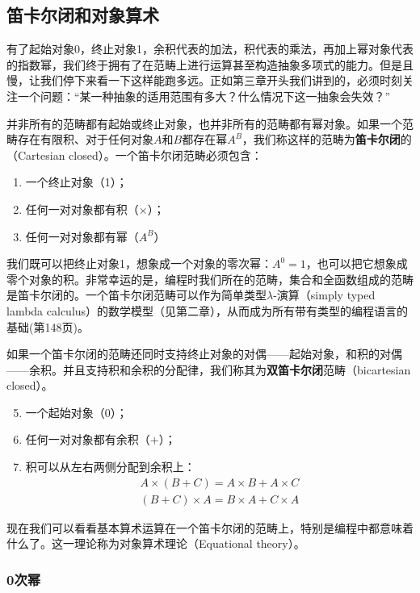 \documentclass{article}
\begin{document}
\subsection{笛卡尔闭和对象算术}

有了起始对象0，终止对象1，余积代表的加法，积代表的乘法，再加上幂对象代表的指数幂，我们终于拥有了在范畴上进行运算甚至构造抽象多项式的能力。但是且慢，让我们停下来看一下这样能跑多远。正如第三章开头我们讲到的，必须时刻关注一个问题：“某一种抽象的适用范围有多大？什么情况下这一抽象会失效？”

并非所有的范畴都有起始或终止对象，也并非所有的范畴都有幂对象。如果一个范畴存在有限积、对于任何对象$A$和$B$都存在幂$A^B$，我们称这样的范畴为\textbf{笛卡尔闭}的（Cartesian closed）。一个笛卡尔闭范畴必须包含：

\begin{enumerate}
\item 一个终止对象（1）；
\item 任何一对对象都有积（$\times$）；
\item 任何一对对象都有幂（$A^B$）
\end{enumerate}

我们既可以把终止对象1，想象成一个对象的零次幂：$A^0 = 1$，也可以把它想象成零个对象的积。非常幸运的是，编程时我们所在的范畴，集合和全函数组成的范畴是笛卡尔闭的。一个笛卡尔闭范畴可以作为简单类型$\lambda$-演算（simply typed lambda calculus）的数学模型（见第二章），从而成为所有带有类型的编程语言的基础(\cite{Milewski2018}第148页)。

如果一个笛卡尔闭的范畴还同时支持终止对象的对偶——起始对象，和积的对偶——余积。并且支持积和余积的分配律，我们称其为\textbf{双笛卡尔闭}范畴（bicartesian closed）。

\begin{enumerate}
  \setcounter{enumi}{4}
  \item 一个起始对象（0）；
  \item 任何一对对象都有余积（$+$）；
  \item 积可以从左右两侧分配到余积上：
  \[
  \begin{array}{l}
  A \times (B + C) = A \times B + A \times C \\
  (B + C) \times A = B \times A + C \times A
  \end{array}
  \]
\end{enumerate}

现在我们可以看看基本算术运算在一个笛卡尔闭的范畴上，特别是编程中都意味着什么了。这一理论称为对象算术理论（Equational theory）。

\subsubsection{0次幂}
\end{document}
